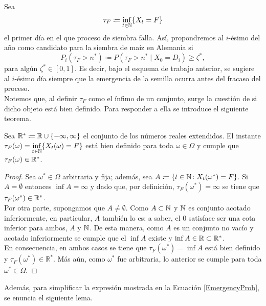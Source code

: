 Sea \begin{equation}
\tau_{F}\coloneq\inf_{t\in\mathbb{N}}\{X_t=F\}
\end{equation} el primer día en el que proceso de siembra falla. Así, propondremos al $i$-ésimo del año como candidato para la siembra de maíz en Alemania si \begin{equation}\label{EmergencyProb}
	P_{i}(	\tau_{F} > n^* ) \coloneq 	P(	\tau_{F} > n^* \mid X_{0}=D_i )  \geq \zeta^*,
\end{equation}para algún $\zeta^*\in [0,1]$. Es decir, bajo el esquema de trabajo anterior, se sugiere al $i$-ésimo día siempre que la emergencia de la semilla ocurra antes del fracaso del proceso.\\


Notemos que, al definir $\tau_F$ como el ínfimo de un conjunto, surge la cuestión de si dicho objeto está bien definido. Para responder a ella se introduce el siguiente teorema.\\

\begin{theorem}
	Sea $\mathbb{R}^*\coloneq \mathbb{R} \cup \{-\infty, \infty\}$ el conjunto de los números reales extendidos. El instante $\displaystyle\tau_F(\omega)=\inf_{t\in\mathbb{N}}\{X_t(\omega)=F\}$ está bien definido para toda $\omega\in \Omega$ y cumple que $\tau_F(\omega)\in \mathbb{R}^*$.
\end{theorem}
\begin{proof}
	Sea $\omega^*\in \Omega$ arbitraria y fija; además, sea $A\coloneq \{t\in\mathbb{N} \colon X_{t}(\omega^*)=F\}$. Si $A=\emptyset$ entonces $\inf A =\infty$ y dado que, por definición, $\tau_F(\omega^*)=\infty$ se tiene que $\tau_F(\omega^*)\in \mathbb{R}^*$.\\
	
	Por otra parte, supongamos que $A\neq\emptyset$. Como $A\subset \mathbb{N}$ y $\mathbb{N}$ es conjunto acotado inferiormente, en particular, $A$ también lo es; a saber, el $0$ satisface ser una cota inferior para ambos, $A$ y $\mathbb{N}$. De esta manera, como $A$ es un conjunto no vacío y acotado inferiormente se cumple que el $\inf A$ existe y $\inf A\in \mathbb{R}\subset \mathbb{R}^*$.\\
	
	En consecuencia, en ambos casos se tiene que $\tau_F(\omega^*)= \inf A$ está bien definido y $\tau_F(\omega^*)\in \mathbb{R}^*$. Más aún, como $\omega^*$ fue arbitraria, lo anterior se cumple para toda $\omega^*\in \Omega$.
\end{proof}

Además, para simplificar la expresión mostrada en la Ecuación \eqref{EmergencyProb}, se enuncia el siguiente lema.\\ 

